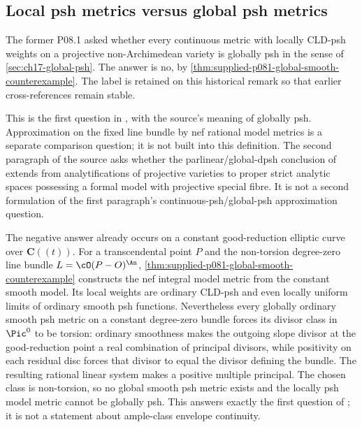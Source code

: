 \subsection{Local psh metrics versus global psh metrics}
\label{sec:ch72-global-metrics-history}

\begin{remark}
\label{prob:frontier-cld-global-metric}
The former P08.1 asked whether every continuous metric with locally CLD-psh
weights on a projective non-Archimedean variety is globally psh in the sense
of \cref{sec:ch17-global-psh}.  The answer is no, by
\cref{thm:supplied-p081-global-smooth-counterexample}.  The label is retained
on this historical remark so that earlier cross-references remain stable.
\end{remark}

This is the first question in \cite[Remark~17.8.10]{CLD25}, with
the source's meaning of globally psh.  Approximation on the fixed line
bundle by nef rational model metrics is a separate comparison question;
it is not built into this definition.  The second paragraph of the source
asks whether the parlinear/global-dpsh conclusion of
\cite[Corollary~17.8.9]{CLD25} extends from analytifications of projective
varieties to proper strict analytic spaces possessing a formal model with
projective special fibre.  It is not a second formulation of the first
paragraph's continuous-psh/global-psh approximation question.

The negative answer already occurs on a constant good-reduction elliptic
curve over \(\mathbf C((t))\).  For a transcendental point \(P\) and the
non-torsion degree-zero line bundle \(L=\cO(P-O)^{\An}\),
\cref{thm:supplied-p081-global-smooth-counterexample} constructs the nef
integral model metric from the constant smooth model.  Its local weights are
ordinary CLD-psh and even locally uniform limits of ordinary smooth psh
functions.  Nevertheless every globally ordinary smooth psh metric on a
constant degree-zero bundle forces its divisor class in \(\Pic^0\) to be
torsion: ordinary smoothness makes the outgoing slope divisor at the
good-reduction point a real combination of principal divisors, while
positivity on each residual disc forces that divisor to equal the divisor
defining the bundle.  The resulting rational linear system makes a positive
multiple principal.  The chosen class is non-torsion, so no global smooth
psh metric exists and the locally psh model metric cannot be globally psh.
This answers exactly the first question of
\cite[Remark~17.8.10]{CLD25}; it is not a statement about ample-class
envelope continuity.


